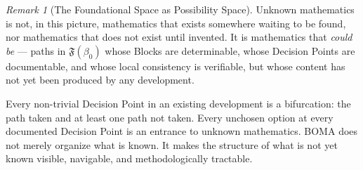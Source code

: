 \documentclass[12pt, a4paper]{article}
\theoremstyle{plain}
\theoremstyle{definition}
\theoremstyle{remark}
\newtheorem{remark}[theorem]{Remark}
\newcommand{\FS}[1]{\mathfrak{F}(#1)}
\newcommand{\BOMA}{\textsf{BOMA}}
\begin{document}
\begin{remark}[The Foundational Space as Possibility Space]
\label{rem:possibility}
Unknown mathematics is not, in this picture, mathematics that
exists somewhere waiting to be found, nor mathematics that does
not exist until invented. It is mathematics that \emph{could be}
--- paths in $\FS{\beta_0}$ whose Blocks are determinable, whose
Decision Points are documentable, and whose local consistency is
verifiable, but whose content has not yet been produced by any
development.

Every non-trivial Decision Point in an existing development is a
bifurcation: the path taken and at least one path not taken.
Every unchosen option at every documented Decision Point is an
entrance to unknown mathematics. \BOMA{} does not merely organize
what is known. It makes the structure of what is not yet known
visible, navigable, and methodologically tractable.
\end{remark}
\end{document}

